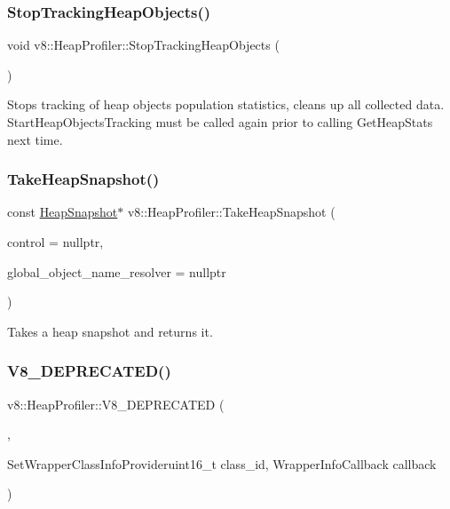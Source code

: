 \subsubsection{\texorpdfstring{Stop\+Tracking\+Heap\+Objects()}{StopTrackingHeapObjects()}}
{\footnotesize\ttfamily void v8\+::\+Heap\+Profiler\+::\+Stop\+Tracking\+Heap\+Objects (\begin{DoxyParamCaption}{ }\end{DoxyParamCaption})}

Stops tracking of heap objects population statistics, cleans up all collected data. Start\+Heap\+Objects\+Tracking must be called again prior to calling Get\+Heap\+Stats next time. \mbox{\label{classv8_1_1HeapProfiler_a9df0b9a5dedcfc0ac796724cca36e7d7}} 
\subsubsection{\texorpdfstring{Take\+Heap\+Snapshot()}{TakeHeapSnapshot()}}
{\footnotesize\ttfamily const \mbox{\hyperlink{classv8_1_1HeapSnapshot}{Heap\+Snapshot}}$\ast$ v8\+::\+Heap\+Profiler\+::\+Take\+Heap\+Snapshot (\begin{DoxyParamCaption}\item[{\mbox{\hyperlink{classv8_1_1ActivityControl}{Activity\+Control}} $\ast$}]{control = {\ttfamily nullptr},  }\item[{\mbox{\hyperlink{classv8_1_1HeapProfiler_1_1ObjectNameResolver}{Object\+Name\+Resolver}} $\ast$}]{global\+\_\+object\+\_\+name\+\_\+resolver = {\ttfamily nullptr} }\end{DoxyParamCaption})}

Takes a heap snapshot and returns it. \mbox{\label{classv8_1_1HeapProfiler_af41ccd8baea0da8d701e565b7b2e8eab}} 
\subsubsection{\texorpdfstring{V8\+\_\+\+D\+E\+P\+R\+E\+C\+A\+T\+E\+D()}{V8\_DEPRECATED()}}
{\footnotesize\ttfamily v8\+::\+Heap\+Profiler\+::\+V8\+\_\+\+D\+E\+P\+R\+E\+C\+A\+T\+ED (\begin{DoxyParamCaption}\item[{\char`\"{}Use Add\+Build\+Embedder\+Graph\+Callback to provide info about embedder nodes\char`\"{}}]{,  }\item[{void }]{Set\+Wrapper\+Class\+Info\+Provideruint16\+\_\+t class\+\_\+id, Wrapper\+Info\+Callback callback }\end{DoxyParamCaption})}

